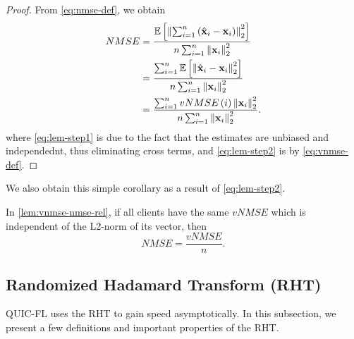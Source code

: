 \documentclass[journal,12pt,twocolumn]{IEEEtran}
\begin{document}
\begin{proof}
    \label{proof:vnmse-nmse-rel}
    From \eqref{eq:nmse-def}, we obtain
    \begin{align}
        NMSE &= \frac{\mathbb{E}\left[ \left\lVert\sum_{i=1}^n\left(\hat{\boldsymbol{\mathbf{x}}}_i - \boldsymbol{\mathbf{x}}_i\right)\right\rVert_2^2 \right]}{n\sum_{i=1}^n\left\lVert\boldsymbol{\mathbf{x}}_i\right\rVert_2^2} \\
        &= \frac{\sum_{i=1}^n\mathbb{E}\left[ \left\lVert\hat{\boldsymbol{\mathbf{x}}}_i - \boldsymbol{\mathbf{x}}_i\right\rVert_2^2 \right]}{n\sum_{i=1}^n\left\lVert\boldsymbol{\mathbf{x}}_i\right\rVert_2^2} \label{eq:lem-step1} \\
        &= \frac{\sum_{i=1}^nvNMSE\left(i\right)\left\lVert\boldsymbol{\mathbf{x}}_i\right\rVert_2^2}{n\sum_{i=1}^n\left\lVert\boldsymbol{\mathbf{x}}_i\right\rVert_2^2}. \label{eq:lem-step2}
    \end{align}
    where \eqref{eq:lem-step1} is due to the fact that the estimates are
    unbiased and independednt, thus eliminating cross terms, and
    \eqref{eq:lem-step2} is by \eqref{eq:vnmse-def}.
\end{proof}
We also obtain this simple corollary as a result of \eqref{eq:lem-step2}.
\begin{corollary}
    \label{cor:vnmse-equal}
    In \autoref{lem:vnmse-nmse-rel}, if all clients have the same \(vNMSE\)
    which is independent of the L2-norm of its vector, then
    \begin{equation}
        NMSE = \frac{vNMSE}{n}.
        \label{eq:nmse-vnmse-eq}
    \end{equation}
\end{corollary}
\subsection{Randomized Hadamard Transform (RHT)}
\label{ssec:rht}
QUIC-FL uses the RHT to gain speed asymptotically. In this subsection, we
present a few definitions and important properties of the RHT.
\end{document}
